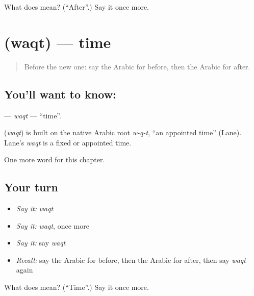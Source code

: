 \begin{tcolorbox}[breakable,colback=teal!4,colframe=teal!35!black,title={Before you move on}]
What does  mean? (\textquotedblleft{}After\textquotedblright{}.) Say it once more.
\end{tcolorbox}
\section[\texorpdfstring{\ar{وقت} (waqt)}{وقت (waqt)}]{ (waqt) — time}

\label{lesson:AR-C88-waqt}



\begin{quote}
Before the new one: say the Arabic for before, then the Arabic for after.
\end{quote}

\subsection*{You'll want to know: }
\textbf{} — \emph{waqt} — \textquotedblleft{}time\textquotedblright{}.

\begin{cousinweb}
\textbf{} (\emph{waqt}) is built on the native Arabic root \emph{w-q-t}, \textquotedblleft{}an appointed time\textquotedblright{} (Lane). Lane's \emph{waqt} is a fixed or appointed time.
\end{cousinweb}

\begin{grammarlens}[title={What you've built}]
One more word for this chapter.
\end{grammarlens}

\subsection*{Your turn}
\begin{itemize}
\raggedright
  \item \emph{Say it:} \emph{waqt}
  \item \emph{Say it:} \emph{waqt}, once more
  \item \emph{Say it:} say \emph{waqt}
  \item \emph{Recall:} say the Arabic for before, then the Arabic for after, then say \emph{waqt} again
\end{itemize}

\begin{tcolorbox}[breakable,colback=teal!4,colframe=teal!35!black,title={Before you move on}]
What does  mean? (\textquotedblleft{}Time\textquotedblright{}.) Say it once more.
\end{tcolorbox}
